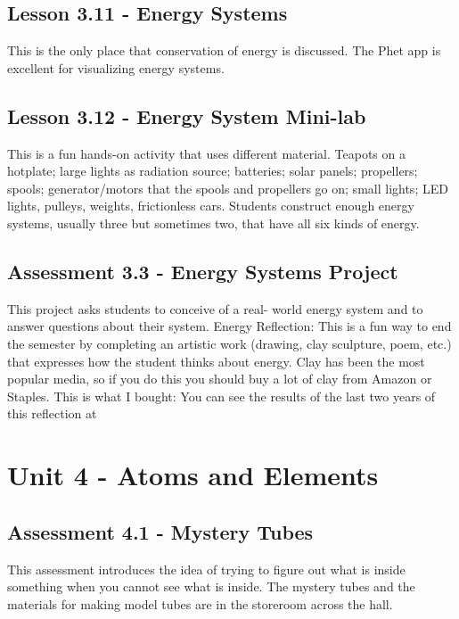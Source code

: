 \documentclass[12pt]{article}
\begin{document}
\subsection{Lesson 3.11 - Energy Systems}

This is the only place that conservation of energy is discussed. The Phet app is excellent for visualizing energy systems.

\subsection{Lesson 3.12 - Energy System Mini-lab}

This is a fun hands-on activity that uses different material. Teapots on a hotplate; large lights as radiation source; batteries; solar panels; propellers; spools; generator/motors that the spools and propellers go on; small lights; LED lights, pulleys, weights, frictionless cars. Students construct enough energy systems, usually three but sometimes two, that have all six kinds of energy.

\subsection*{Assessment 3.3 - Energy Systems Project} 

This project asks students to conceive of a real-
world energy system and to answer questions about their system.
Energy Reflection: This is a fun way to end the semester by completing an artistic work
(drawing, clay sculpture, poem, etc.) that expresses how the student thinks about energy. Clay
has been the most popular media, so if you do this you should buy a lot of clay from Amazon or
Staples. This is what I bought:
You can see the results of the last two years of this reflection at


\section{Unit 4 - Atoms and Elements}

\subsection*{Assessment 4.1 - Mystery Tubes} 

This assessment introduces the idea of trying to figure out
what is inside something when you cannot see what is inside. The mystery tubes and the materials for making model tubes are in the storeroom across the hall.
\end{document}
